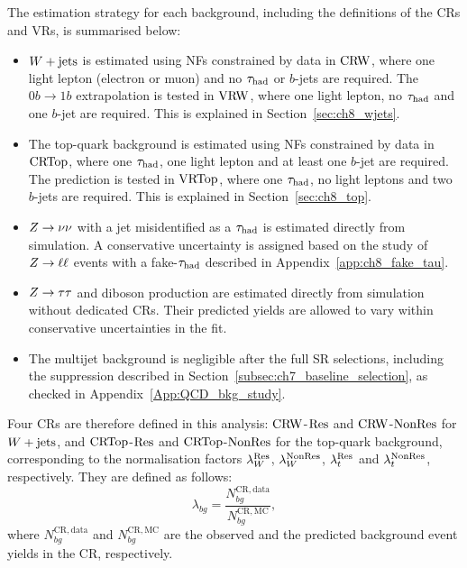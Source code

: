 The estimation strategy for each background, including the definitions of the CRs and VRs, is summarised below:
\begin{itemize}
    \item $W+\mathrm{jets}$ is estimated using NFs constrained by data in $\mathrm{CRW}$, where one light lepton (electron or muon) and no $\tau_{\mathrm{had}}$ or $b$-jets are required.
    The $0b\to1b$ extrapolation is tested in $\mathrm{VRW}$, where one light lepton, no $\tau_{\mathrm{had}}$ and one $b$-jet are required. This is explained in Section~\ref{sec:ch8_wjets}.

    \item The top-quark background is estimated using NFs constrained by data in $\mathrm{CRTop}$, where one $\tau_{\mathrm{had}}$, one light lepton and at least one $b$-jet are required.
    The prediction is tested in $\mathrm{VRTop}$, where one $\tau_{\mathrm{had}}$, no light leptons and two $b$-jets are required. This is explained in Section~\ref{sec:ch8_top}.

    \item $Z\rightarrow\nu\nu$ with a jet misidentified as a $\tau_{\mathrm{had}}$ is estimated directly from simulation.
    A conservative uncertainty is assigned based on the study of $Z\rightarrow\ell\ell$ events with a fake-$\tau_{\mathrm{had}}$ described in Appendix~\ref{app:ch8_fake_tau}.

    \item $Z\rightarrow\tau\tau$ and diboson production are estimated directly from simulation without dedicated CRs.
    Their predicted yields are allowed to vary within conservative uncertainties in the fit.

    \item The multijet background is negligible after the full SR selections, including the suppression described in Section~\ref{subsec:ch7_baseline_selection}, as checked in Appendix~\ref{App:QCD_bkg_study}.
\end{itemize}

Four CRs are therefore defined in this analysis: $\mathrm{CRW}$-$\mathrm{Res}$ and $\mathrm{CRW}$-$\mathrm{NonRes}$ for $W+\mathrm{jets}$, and $\mathrm{CRTop}$-$\mathrm{Res}$ and $\mathrm{CRTop}$-$\mathrm{NonRes}$ for the top-quark background, corresponding to the normalisation factors $\lambda_W^{\mathrm{Res}}$, $\lambda_W^{\mathrm{NonRes}}$, $\lambda_t^{\mathrm{Res}}$ and $\lambda_t^{\mathrm{NonRes}}$, respectively. They are defined as follows:
\begin{equation*}
    \lambda_{bg} = \frac{N_{bg}^{\mathrm{CR,data}}}{N_{bg}^{\mathrm{CR,MC}}},
\end{equation*}
where $N_{bg}^{\mathrm{CR,data}}$ and $N_{bg}^{\mathrm{CR,MC}}$ are the observed and the predicted background event yields in the CR, respectively.

